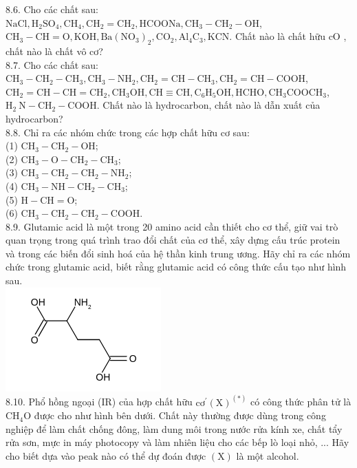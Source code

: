 \documentclass[10pt]{article}
\begin{document}
8.6. Cho các chất sau: $\mathrm{NaCl}, \mathrm{H}_{2} \mathrm{SO}_{4}, \mathrm{CH}_{4}, \mathrm{CH}_{2}=\mathrm{CH}_{2}, \mathrm{HCOONa}, \mathrm{CH}_{3}-\mathrm{CH}_{2}-\mathrm{OH}$, $\mathrm{CH}_{3}-\mathrm{CH}=\mathrm{O}, \mathrm{KOH}, \mathrm{Ba}\left(\mathrm{NO}_{3}\right)_{2}, \mathrm{CO}_{2}, \mathrm{Al}_{4} \mathrm{C}_{3}, \mathrm{KCN}$. Chất nào là chất hữu cO , chất nào là chất vô cơ?\\
8.7. Cho các chất sau: $\mathrm{CH}_{3}-\mathrm{CH}_{2}-\mathrm{CH}_{3}, \mathrm{CH}_{3}-\mathrm{NH}_{2}, \mathrm{CH}_{2}=\mathrm{CH}-\mathrm{CH}_{3}, \mathrm{CH}_{2}=\mathrm{CH}-\mathrm{COOH}$, $\mathrm{CH}_{2}=\mathrm{CH}-\mathrm{CH}=\mathrm{CH}_{2}, \mathrm{CH}_{3} \mathrm{OH}, \mathrm{CH} \equiv \mathrm{CH}, \mathrm{C}_{6} \mathrm{H}_{5} \mathrm{OH}, \mathrm{HCHO}, \mathrm{CH}_{3} \mathrm{COOCH}_{3}$, $\mathrm{H}_{2} \mathrm{~N}-\mathrm{CH}_{2}-\mathrm{COOH}$. Chất nào là hydrocarbon, chất nào là dẫn xuất của hydrocarbon?\\
8.8. Chỉ ra các nhóm chức trong các hợp chất hữu cơ sau:\\
(1) $\mathrm{CH}_{3}-\mathrm{CH}_{2}-\mathrm{OH}$;\\
(2) $\mathrm{CH}_{3}-\mathrm{O}-\mathrm{CH}_{2}-\mathrm{CH}_{3}$;\\
(3) $\mathrm{CH}_{3}-\mathrm{CH}_{2}-\mathrm{CH}_{2}-\mathrm{NH}_{2}$;\\
(4) $\mathrm{CH}_{3}-\mathrm{NH}-\mathrm{CH}_{2}-\mathrm{CH}_{3}$;\\
(5) $\mathrm{H}-\mathrm{CH}=\mathrm{O}$;\\
(6) $\mathrm{CH}_{3}-\mathrm{CH}_{2}-\mathrm{CH}_{2}-\mathrm{COOH}$.\\
8.9. Glutamic acid là một trong 20 amino acid cần thiết cho cơ thể, giữ vai trò quan trọng trong quá trình trao đổi chất của cơ thể, xây dựng cấu trúc protein và trong các biến đổi sinh hoá của hệ thần kinh trung ương. Hãy chỉ ra các nhóm chức trong glutamic acid, biết rằng glutamic acid có công thức cấu tạo như hình sau.\\
\includegraphics{smile-96a02832cbf34235a61de09d3783ad7a22b48504}\\
8.10. Phổ hồng ngoại (IR) của hợp chất hữu $\mathrm{cơ}^{\prime}(\mathrm{X})^{(*)}$ có công thức phân tử là $\mathrm{CH}_{4} \mathrm{O}$ được cho như hình bên dưới. Chất này thường được dùng trong công nghiệp để làm chất chống đông, làm dung môi trong nước rửa kính xe, chất tẩy rửa sơn, mực in máy photocopy và làm nhiên liệu cho các bếp lò loại nhỏ, ... Hãy cho biết dựa vào peak nào có thể dự đoán được $(\mathrm{X})$ là một alcohol.
\end{document}
